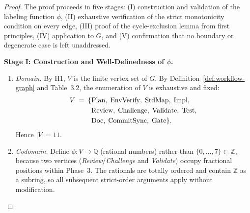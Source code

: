 \documentclass[12pt]{article}
\theoremstyle{definition}
\begin{document}
\begin{proof}
The proof proceeds in five stages: (I) construction and validation of the
labeling function $\phi$, (II) exhaustive verification of the strict
monotonicity condition on every edge, (III) proof of the cycle-exclusion
lemma from first principles, (IV) application to $G$, and (V) confirmation
that no boundary or degenerate case is left unaddressed.

\medskip
\noindent\textbf{Stage I: Construction and Well-Definedness of $\phi$.}

\begin{enumerate}
  \item \emph{Domain.} By H1, $V$ is the finite vertex set of $G$.
        By Definition~\ref{def:workflow-graph} and Table~3.2, the
        enumeration of $V$ is exhaustive and fixed:
        \begin{align}
          V \;=\; \{&\mathrm{Plan},\; \mathrm{EnvVerify},\;
                     \mathrm{StdMap},\; \mathrm{Impl},\notag\\
                    &\mathrm{Review},\; \mathrm{Challenge},\;
                     \mathrm{Validate},\; \mathrm{Test},\notag\\
                    &\mathrm{Doc},\; \mathrm{CommitSync},\;
                     \mathrm{Gate}\}.
        \end{align}
        Hence $|V| = 11$.

  \item \emph{Codomain.} Define $\phi : V \to \mathbb{Q}$ (rational
        numbers) rather than $\{0,\ldots,7\} \subset \mathbb{Z}$, because
        two vertices (\textit{Review}/\textit{Challenge} and
        \textit{Validate}) occupy fractional positions within Phase~3.
        The rationals are totally ordered and contain $\mathbb{Z}$ as a
        subring, so all subsequent strict-order arguments apply without
        modification.


\end{enumerate}
\end{proof}
\end{document}

